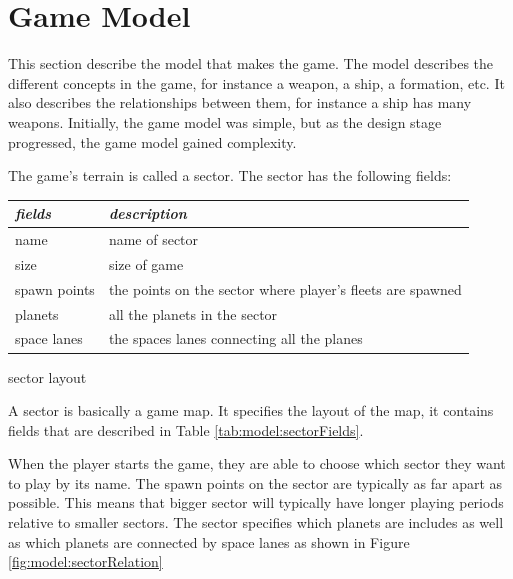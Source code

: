 \section{Game Model}

% 

This section describe the model that makes the game.
The model describes the different concepts in the game, for instance a weapon, a ship, a formation, etc.
It also describes the relationships between them, for instance a ship has many weapons.
Initially, the game model was simple, but as the design stage progressed, the game model gained complexity.

The game's terrain is called a sector. The sector has the following fields:
\begin{margintable}
    \begin{tabular}{p{4em} p{11em}}
    \toprule
    \emph{fields} & \emph{description} \\
    \midrule

    name & name of sector \\
    size & size of game \\
    spawn points & the points on the sector where player's fleets are spawned \\
    planets & all the planets in the sector \\
    space lanes & the spaces lanes connecting all the planes \\

    \bottomrule
    \end{tabular}
    	\vspace{1em}
	\caption{sector layout}
	\label{tab:model:sectorFields}
\end{margintable}

A sector is basically a game map.
It specifies the layout of the map, it contains fields that are described in Table \ref{tab:model:sectorFields}.

When the player starts the game, they are able to choose which sector they want to play by its name. 
The spawn points on the sector are typically as far apart as possible. 
This means that bigger sector will typically have longer playing periods relative to smaller sectors.
The sector specifies which planets are includes as well as which planets are connected by space lanes as shown in Figure \ref{fig:model:sectorRelation}

